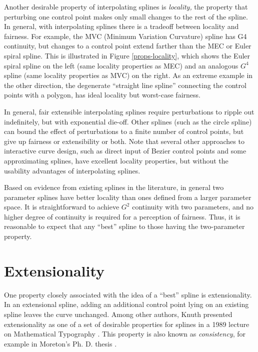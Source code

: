 \documentclass{article}
\begin{document}
Another desirable property of interpolating splines is
\emph{locality,} the property that perturbing one control point makes
only small changes to the rest of the spline. In general, with
interpolating splines there is a tradeoff between locality and
fairness. For example, the MVC (Minimum Variation Curvature) spline
has G4 continuity, but changes to a control point extend farther than
the MEC or Euler spiral spline. This is illustrated in Figure
\ref{props-locality}, which shows the Euler spiral spline on the left
(same locality properties as MEC) and an analogous $G^4$ spline (same
locality properties as MVC) on the right. As an extreme example in the other
direction, the degenerate ``straight line spline'' connecting the
control points with a polygon, has ideal locality but worst-case
fairness.

In general, fair extensible interpolating splines require
perturbations to ripple out indefinitely, but with exponential
die-off. Other splines (such as the circle spline) can bound the
effect of perturbations to a finite number of control points, but give
up fairness or extensibility or both. Note that several other
approaches to interactive curve design, such as direct input of Bezier
control points and some approximating splines, have excellent locality
properties, but without the usability advantages of interpolating
splines.

Based on evidence from existing splines in the literature, in general
two parameter splines have better locality than ones defined from a
larger parameter space. It is straightforward to achieve $G^2$
continuity with two parameters, and no higher degree of continuity is
required for a perception of fairness. Thus, it is reasonable to
expect that any ``best'' spline to those having the
two-parameter property.

\section{Extensionality}

One property closely associated with the idea of a ``best'' spline is
extensionality. In an extensional spline, adding an additional control
point lying on an existing spline leaves the curve unchanged. Among
other authors, Knuth presented extensionality as one of a set of
desirable properties for splines in a 1989 lecture on Mathematical
Typography \cite[pp. 39--42]{Knuth:1999:DT}. This property is also
known as \emph{consistency}, for example in Moreton's Ph. D. thesis
\cite[p. 28]{Moreton92}.
\end{document}
